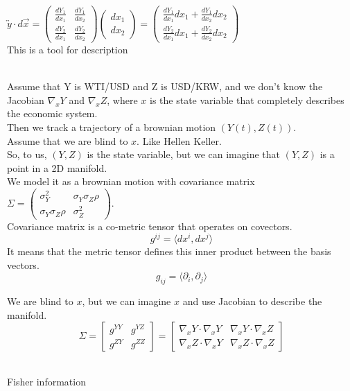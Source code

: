 \documentclass{article}
\begin{document}
\begin{description}
          $\overleftrightarrow{y}\cdot d\vec{x} = \begin{pmatrix} \frac{dY_1}{dx_1} & \frac{dY_1}{dx_2} \\ \frac{dY_2}{dx_1} & \frac{dY_2}{dx_2} \end{pmatrix} \begin{pmatrix} dx_1 \\ dx_2 \end{pmatrix} = \begin{pmatrix} \frac{dY_1}{dx_1}dx_1 + \frac{dY_1}{dx_2}dx_2 \\ \frac{dY_2}{dx_1}dx_1 + \frac{dY_2}{dx_2}dx_2 \end{pmatrix}$\\
          This is a tool for description
    \item[Metric tensor ($g_{ij}$)] ~\\
          Assume that Y is WTI/USD and Z is USD/KRW, and we don't know the Jacobian $\nabla_x Y$ and $\nabla_x Z$, where $x$ is the state variable that completely describes the economic system.\\
          Then we track a trajectory of a brownian motion $(Y(t), Z(t))$.\\
          Assume that we are blind to $x$. Like Hellen Keller.\\
          So, to us, $(Y,Z)$ is the state variable, but we can imagine that $(Y,Z)$ is a point in a 2D manifold.\\
          We model it as a brownian motion with covariance matrix $\Sigma =  \begin{pmatrix} \sigma_Y^2 & \sigma_Y \sigma_Z \rho \\ \sigma_Y \sigma_Z \rho & \sigma_Z^2 \end{pmatrix}$.\\
          Covariance matrix is a co-metric tensor that operates on covectors.
          \begin{equation*}
              g^{ij} =  \langle dx^i, dx^j \rangle
          \end{equation*}
          It means that the metric tensor defines this inner product between the basis vectors.
          \begin{equation*}
              g_{ij} = \langle \partial_i, \partial_j \rangle
          \end{equation*}
    \item[Imagination]
          We are blind to $x$, but we can imagine $x$ and use Jacobian to describe the manifold.
          \begin{equation*}
              \Sigma = \begin{bmatrix} g^{YY} & g^{YZ} \\ g^{ZY} & g^{ZZ} \end{bmatrix} = \begin{bmatrix} \nabla_x Y \cdot \nabla_x Y & \nabla_x Y \cdot \nabla_x Z \\ \nabla_x Z \cdot \nabla_x Y & \nabla_x Z \cdot \nabla_x Z \end{bmatrix}
          \end{equation*}
    \item[TODO] ~\\
          Fisher information
\end{description}
\end{document}
